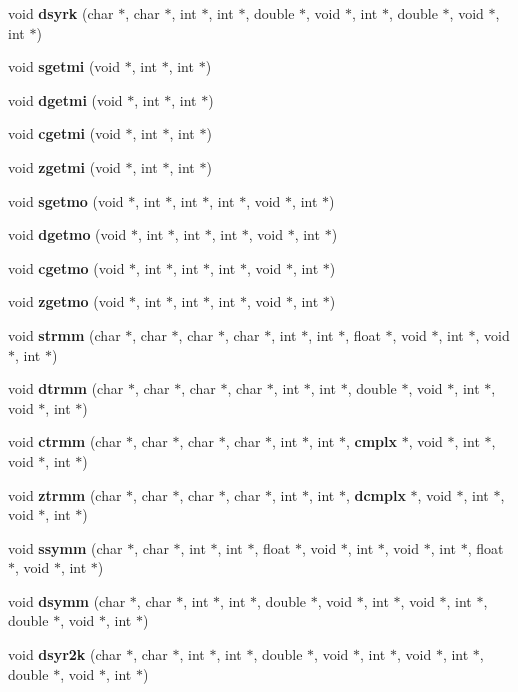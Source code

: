 \begin{CompactItemize}
\item 
void {\bf dsyrk} (char $\ast$, char $\ast$, int $\ast$, int $\ast$, double $\ast$, void $\ast$, int $\ast$, double $\ast$, void $\ast$, int $\ast$)
\item 
void {\bf sgetmi} (void $\ast$, int $\ast$, int $\ast$)
\item 
void {\bf dgetmi} (void $\ast$, int $\ast$, int $\ast$)
\item 
void {\bf cgetmi} (void $\ast$, int $\ast$, int $\ast$)
\item 
void {\bf zgetmi} (void $\ast$, int $\ast$, int $\ast$)
\item 
void {\bf sgetmo} (void $\ast$, int $\ast$, int $\ast$, int $\ast$, void $\ast$, int $\ast$)
\item 
void {\bf dgetmo} (void $\ast$, int $\ast$, int $\ast$, int $\ast$, void $\ast$, int $\ast$)
\item 
void {\bf cgetmo} (void $\ast$, int $\ast$, int $\ast$, int $\ast$, void $\ast$, int $\ast$)
\item 
void {\bf zgetmo} (void $\ast$, int $\ast$, int $\ast$, int $\ast$, void $\ast$, int $\ast$)
\item 
void {\bf strmm} (char $\ast$, char $\ast$, char $\ast$, char $\ast$, int $\ast$, int $\ast$, float $\ast$, void $\ast$, int $\ast$, void $\ast$, int $\ast$)
\item 
void {\bf dtrmm} (char $\ast$, char $\ast$, char $\ast$, char $\ast$, int $\ast$, int $\ast$, double $\ast$, void $\ast$, int $\ast$, void $\ast$, int $\ast$)
\item 
void {\bf ctrmm} (char $\ast$, char $\ast$, char $\ast$, char $\ast$, int $\ast$, int $\ast$, {\bf cmplx} $\ast$, void $\ast$, int $\ast$, void $\ast$, int $\ast$)
\item 
void {\bf ztrmm} (char $\ast$, char $\ast$, char $\ast$, char $\ast$, int $\ast$, int $\ast$, {\bf dcmplx} $\ast$, void $\ast$, int $\ast$, void $\ast$, int $\ast$)
\item 
void {\bf ssymm} (char $\ast$, char $\ast$, int $\ast$, int $\ast$, float $\ast$, void $\ast$, int $\ast$, void $\ast$, int $\ast$, float $\ast$, void $\ast$, int $\ast$)
\item 
void {\bf dsymm} (char $\ast$, char $\ast$, int $\ast$, int $\ast$, double $\ast$, void $\ast$, int $\ast$, void $\ast$, int $\ast$, double $\ast$, void $\ast$, int $\ast$)
\item 
void {\bf dsyr2k} (char $\ast$, char $\ast$, int $\ast$, int $\ast$, double $\ast$, void $\ast$, int $\ast$, void $\ast$, int $\ast$, double $\ast$, void $\ast$, int $\ast$)

\end{CompactItemize}
